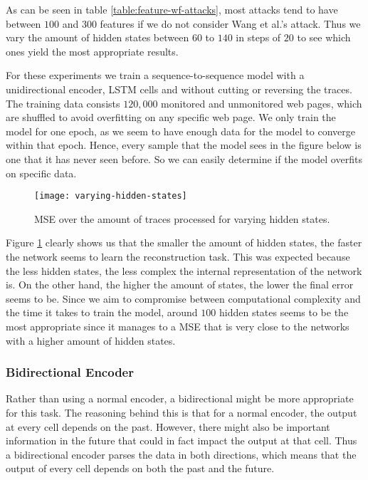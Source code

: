 As can be seen in table \ref{table:feature-wf-attacks}, most attacks tend to have between $100$ and $300$ features if we do not consider Wang et al.'s attack.
Thus we vary the amount of hidden states between $60$ to $140$ in steps of $20$ to see which ones yield the most appropriate results.

For these experiments we train a sequence-to-sequence model with a unidirectional encoder, LSTM cells and without cutting or reversing the traces.
The training data consists $120,000$ monitored and unmonitored web pages, which are shuffled to avoid overfitting on any specific web page.
We only train the model for one epoch, as we seem to have enough data for the model to converge within that epoch.
Hence, every sample that the model sees in the figure below is one that it has never seen before.
So we can easily determine if the model overfits on specific data.

\begin{figure}[ht]
  \centering
  \texttt{[image: varying-hidden-states]}
  \caption{MSE over the amount of traces processed for varying hidden states.}
  \label{fig:varying-hidden-states}
\end{figure}

Figure \ref{fig:varying-hidden-states} clearly shows us that the smaller the amount of hidden states, the faster the network seems to learn the reconstruction task.
This was expected because the less hidden states, the less complex the internal representation of the network is.
On the other hand, the higher the amount of states, the lower the final error seems to be.
Since we aim to compromise between computational complexity and the time it takes to train the model, around $100$ hidden states seems to be the most appropriate since it manages to a MSE that is very close to the networks with a higher amount of hidden states.

\subsubsection{Bidirectional Encoder}

Rather than using a normal encoder, a bidirectional might be more appropriate for this task.
The reasoning behind this is that for a normal encoder, the output at every cell depends on the past.
However, there might also be important information in the future that could in fact impact the output at that cell.
Thus a bidirectional encoder parses the data in both directions, which means that the output of every cell depends on both the past and the future.

